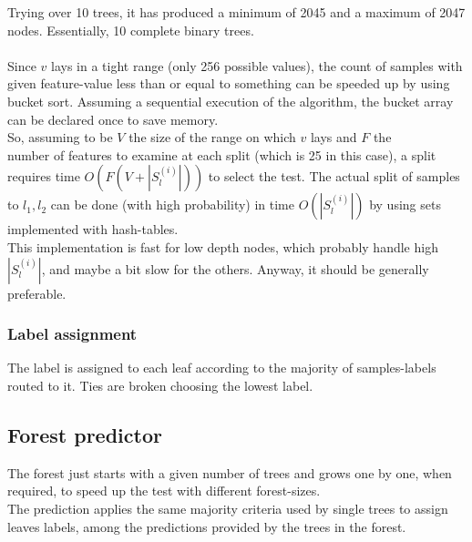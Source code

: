 \documentclass[12pt]{article}
\begin{document}
Trying over 10 trees, it has produced a minimum of 2045 and a maximum of 2047 nodes. Essentially, 10 complete binary trees.\\\\
Since $v$ lays in a tight range (only 256 possible values), the count of samples with given feature-value less than or equal to something can be speeded up by using bucket sort. Assuming a sequential execution of the algorithm, the bucket array can be declared once to save memory.\\
So, assuming to be $V$ the size of the range on which $v$ lays and $F$ the\\ number of features to examine at each split (which is 25 in this case), a split requires time $O(F(V + |S_l^{(i)}|))$ to select the test. The actual split of samples to $l_1, l_2$ can be done (with high probability) in time $O(|S_l^{(i)}|)$ by using sets implemented with hash-tables.\\
This implementation is fast for low depth nodes, which probably handle high $|S_l^{(i)}|$, and maybe a bit slow for the others. Anyway, it should be generally preferable.
\subsubsection{Label assignment}
The label is assigned to each leaf according to the majority of samples-labels routed to it. Ties are broken choosing the lowest label.
\subsection{Forest predictor}
The forest just starts with a given number of trees and grows one by one, when required, to speed up the test with different forest-sizes.\\
The prediction applies the same majority criteria used by single trees to assign leaves labels, among the predictions provided by the trees in the forest.
\newpage
\end{document}
